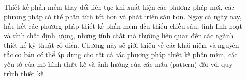 \documentclass[12pt,a4paper,oneside]{article}
\begin{document}
	
	Thiết kế phần mềm thay đổi liên tục khi xuất hiện các phương pháp mới, các phương pháp có thể phân tích tốt hơn và phát triển sâu hơn. Ngay cả ngày nay, hầu hết các phương pháp thiết kế phần mềm đều thiếu chiều sâu, tính linh hoạt và tính chất định lượng, những tính chất mà thường liên quan đến các ngành thiết kế kỹ thuật cổ điển. Chương này sẽ giới thiệu về các khái niệm và nguyên tắc cơ bản có thể áp dụng cho tất cả các phương pháp thiết kế phần mềm, các yếu tố của mô hình thiết kế và ảnh hưởng của các mẫu (pattern) đối với quy trình thiết kế.

	
	
	
	
	
	
	
	
	
	
	

	\clearpage
	\nocite{*}
	\printbibliography[heading=bibintoc, title=Tài liệu tham khảo]
	
	\clearpage
	\printindex
	
\end{document}
